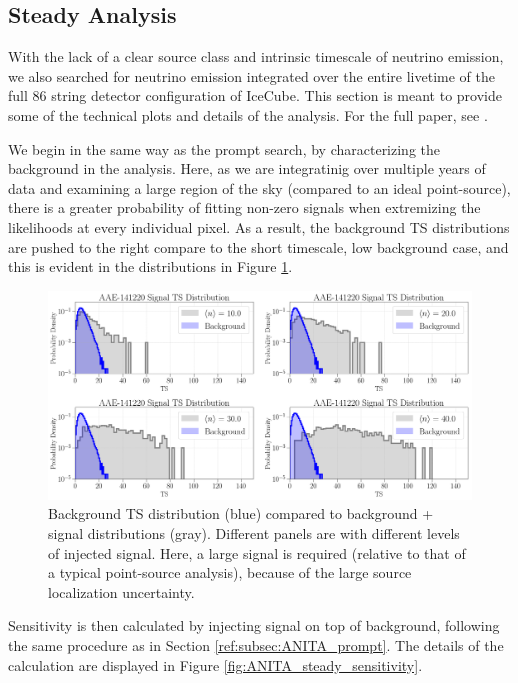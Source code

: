\subsection{Steady Analysis}
\label{ref:subsec:ANITA_steady}
With the lack of a clear source class and intrinsic timescale of neutrino emission, we also searched for neutrino emission integrated over the entire livetime of the full 86 string detector configuration of IceCube. This section is meant to provide some of the technical plots and details of the analysis. For the full paper, see \cite{ANITA PAPER COLLABORATION}.

We begin in the same way as the prompt search, by characterizing the background in the analysis. Here, as we are integratinig over multiple years of data and examining a large region of the sky (compared to an ideal point-source), there is a greater probability of fitting non-zero signals when extremizing the likelihoods at every individual pixel. As a result, the background TS distributions are pushed to the right compare to the short timescale, low background case, and this is evident in the distributions in Figure \ref{fig:ANITA_steady_distributions}.

\begin{figure}
    \centering
    \includegraphics[width=.95\linewidth]{figures/ANITA/Steady/AAE-141220_TS_distributions_with_signal.png}
    \caption[ANITA Steady TS distributions]{Background TS distribution (blue) compared to background + signal distributions (gray). Different panels are with different levels of injected signal. Here, a large signal is required (relative to that of a typical point-source analysis), because of the large source localization uncertainty.}
    \label{fig:ANITA_steady_distributions}
\end{figure}

Sensitivity is then calculated by injecting signal on top of background, following the same procedure as in Section \ref{ref:subsec:ANITA_prompt}. The details of the calculation are displayed in Figure \ref{fig:ANITA_steady_sensitivity}.

